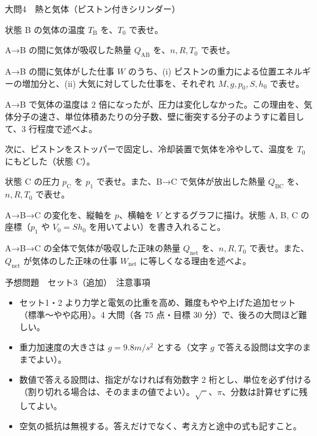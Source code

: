\documentclass[paper=b5, fontsize=8pt, fleqn, twoside]{jlreq}
\begin{document}
\begin{ascolorbox4A}[75点・30分]{大問4　熱と気体（ピストン付きシリンダー）}
\begin{qlist}[resume*=td]
\item 状態 B の気体の温度 $T_\mathrm{B}$ を、$T_0$ で表せ。
\item A→B の間に気体が吸収した熱量 $Q_\mathrm{AB}$ を、$n,R,T_0$ で表せ。
\item A→B の間に気体がした仕事 $W$ のうち、(i) ピストンの重力による位置エネルギーの増加分と、(ii) 大気に対してした仕事を、それぞれ $M,g,p_0,S,h_0$ で表せ。
\item A→B で気体の温度は $2$ 倍になったが、圧力は変化しなかった。この理由を、気体分子の速さ、単位体積あたりの分子数、壁に衝突する分子のようすに着目して、3 行程度で述べよ。
\end{qlist}
次に、ピストンをストッパーで固定し、冷却装置で気体を冷やして、温度を $T_0$ にもどした（状態 C）。
\begin{qlist}[resume*=td]
\item 状態 C の圧力 $p_\mathrm{C}$ を $p_1$ で表せ。また、B→C で気体が放出した熱量 $Q_\mathrm{BC}$ を、$n,R,T_0$ で表せ。
\item A→B→C の変化を、縦軸を $p$、横軸を $V$ とするグラフに描け。状態 A, B, C の座標（$p_1$ や $V_0=Sh_0$ を用いてよい）を書き入れること。
\item A→B→C の全体で気体が吸収した正味の熱量 $Q_\mathrm{net}$ を、$n,R,T_0$ で表せ。また、$Q_\mathrm{net}$ が気体のした正味の仕事 $W_\mathrm{net}$ に等しくなる理由を述べよ。
\end{qlist}
\end{ascolorbox4A}
\clearpage
\begin{simple}[120分・300点]{予想問題　セット3（追加）　注意事項}
\begin{itemize}[leftmargin=1.2\zw,itemsep=0pt,topsep=1pt,parsep=0pt]
\item セット1・2 より力学と電気の比重を高め、難度もやや上げた追加セット（標準〜やや応用）。4 大問（各 75 点・目標 30 分）で、後ろの大問ほど難しい。
\item 重力加速度の大きさは $g=9.8\unit{m/s^2}$ とする（文字 $g$ で答える設問は文字のままでよい）。
\item 数値で答える設問は、指定がなければ有効数字 2 桁とし、単位を必ず付ける（割り切れる場合は、そのままの値でよい）。$\sqrt{\phantom{x}}$、$\pi$、分数は計算せずに残してよい。
\item 空気の抵抗は無視する。答えだけでなく、考え方と途中の式も記すこと。
\end{itemize}
\end{simple}
\end{document}
